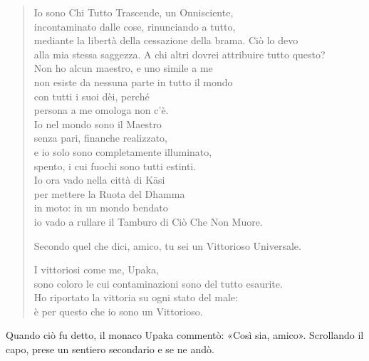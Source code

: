\begin{quote}

  Io sono Chi Tutto Trascende,
  un Onnisciente, \\
  incontaminato dalle cose, rinunciando a tutto, \\
  mediante la libertà della cessazione della brama. Ciò lo devo \\
  alla mia stessa saggezza. A chi altri dovrei attribuire tutto questo? \\
  Non ho alcun maestro, e uno simile a me \\
  non esiste da nessuna parte in tutto il mondo \\
  con tutti i suoi dèi, perché \\
  persona a me omologa non c’è. \\
  Io nel mondo sono il Maestro \\
  senza pari, finanche realizzato, \\
  e io solo sono completamente illuminato, \\
  spento, i cui fuochi sono tutti estinti. \\
  Io ora vado nella città di Kāsi \\
  per mettere la Ruota del Dhamma \\
  in moto: in un mondo bendato \\
  io vado a rullare il Tamburo di Ciò Che Non Muore.

  Secondo quel che dici, amico, tu sei un Vittorioso Universale.

  I vittoriosi come me, Upaka, \\
  sono coloro le cui contaminazioni sono del tutto esaurite. \\
  Ho riportato la vittoria su ogni stato del male: \\
  è per questo che io sono un Vittorioso.

\end{quote}

Quando ciò fu detto, il monaco Upaka commentò: «Così sia, amico». Scrollando il
capo, prese un sentiero secondario e se ne andò.

